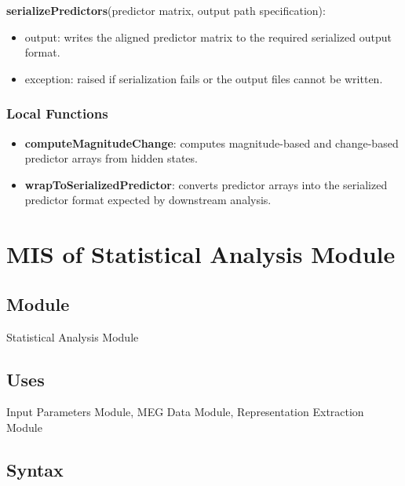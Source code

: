 \documentclass[12pt, titlepage]{article}
\begin{document}
\noindent \textbf{serializePredictors}(predictor matrix, output path specification):
\begin{itemize}
    \item output: writes the aligned predictor matrix to the required serialized output format.
    \item exception: raised if serialization fails or the output files cannot be written.
\end{itemize}

\subsubsection{Local Functions}

\begin{itemize}
    \item \textbf{computeMagnitudeChange}: computes magnitude-based and change-based predictor arrays from hidden states.
    \item \textbf{wrapToSerializedPredictor}: converts predictor arrays into the serialized predictor format expected by downstream analysis.
\end{itemize}











\newpage



\section{MIS of Statistical Analysis Module} \label{Module_StatisticalAnalysis}

\subsection{Module}

Statistical Analysis Module

\subsection{Uses}

Input Parameters Module, MEG Data Module, Representation Extraction Module

\subsection{Syntax}
\end{document}
